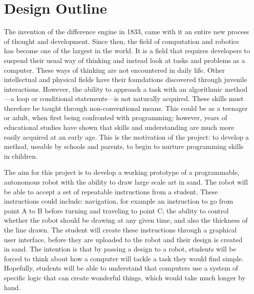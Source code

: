 \chapter{Design Outline}\label{design outline}\label{section \thechapter}


\label{outline aims and motivations}
    The invention of the difference engine in 1833, came with it an entire new process of thought and development. Since then, the field of computation and robotics has become one of the largest in the world. It is a field that requires developers to suspend their usual way of thinking and instead look at tasks and problems as a computer. These ways of thinking are not encountered in daily life. Other intellectual and physical fields have their foundations discovered through juvenile interactions. However, the ability to approach a task with an algorithmic method---a loop or conditional statements---is not naturally acquired. These skills must therefore be taught through non-conventional means. This could be as a teenager or adult, when first being confronted with programming; however, years of educational studies have shown that skills and understanding are much more easily acquired at an early age. This is the motivation of the \SandE project: to develop a method, useable by schools and parents, to begin to nurture programming skills in children.

    The aim for this project is to develop a working prototype of a programmable, autonomous robot with the ability to draw large scale art in sand. The robot will be able to accept a set of repeatable instructions from a student. These instructions could include: navigation, for example an instruction to go from point A to B before turning and traveling to point C; the ability to control whether the robot should be drawing at any given time, and also the thickness of the line drawn. The student will create these instructions through a graphical user interface, before they are uploaded to the robot and their design is created in sand. The intention is that by passing a design to a robot, students will be forced to think about how a computer will tackle a task they would find simple. Hopefully, students will be able to understand that computers use a system of specific logic that can create wonderful things, which would take much longer by hand.


